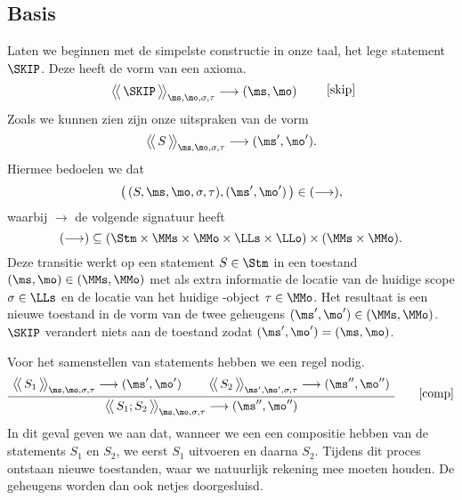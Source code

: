 \subsection{Basis}

Laten we beginnen met de simpelste constructie in onze taal, het lege statement $\SKIP$. Deze heeft de vorm van een axioma.
%
\begin{equation*}
  \AxiomC{$
    \Config{\SKIP}{\ms, \mo, \sigma, \tau}
    \longrightarrow
    (\ms, \mo)
  $}
  {\DisplayProof}
  \tag*{[skip]}
\end{equation*}
%
Zoals we kunnen zien zijn onze uitspraken van de vorm
%
\begin{equation*}
  \Config{S}{\ms,\mo,\sigma,\tau} \longrightarrow (\ms',\mo').
\end{equation*}
%
Hiermee bedoelen we dat
%
\begin{equation*}
  \big(\,(S,\ms,\mo,\sigma,\tau), (\ms',\mo')\,\big) \in (\longrightarrow),
\end{equation*}
%
waarbij $\longrightarrow$ de volgende signatuur heeft 
%
\begin{equation*}
  (\longrightarrow) \subseteq (\Stm \times \MMs \times \MMo \times \LLs \times \LLo) \times (\MMs \times \MMo).
\end{equation*}
%
Deze transitie werkt op een statement $S\in\Stm$ in een toestand $(\ms,\mo)\in(\MMs,\MMo)$ met als extra informatie de locatie van de huidige scope $\sigma\in\LLs$ en de locatie van het huidige \THIS-object $\tau\in\MMo$. Het resultaat is een nieuwe toestand in de vorm van de twee geheugens $(\ms',\mo')\in(\MMs,\MMo)$. $\SKIP$ verandert niets aan de toestand zodat $(\ms',\mo')=(\ms,\mo)$.

Voor het samenstellen van statements hebben we een regel nodig.
%
\begin{gather*}
  \AxiomC{$
    \Config{S_1}{\ms, \mo, \sigma, \tau}
    \longrightarrow
    (\ms', \mo')
  $}
  \AxiomC{$
    \Config{S_2}{\ms', \mo', \sigma, \tau}
    \longrightarrow
    (\ms'', \mo'')
  $}
  \BinaryInfC{$
    \Config{S_1; S_2}{\ms, \mo, \sigma, \tau}
    \longrightarrow
    (\ms'', \mo'')
  $}
  {\DisplayProof}
  \tag*{[comp]}
\end{gather*}
%
In dit geval geven we aan dat, wanneer we een een compositie hebben van de statements $S_1$ en $S_2$, we eerst $S_1$ uitvoeren%
en daarna $S_2$. Tijdens dit proces ontstaan nieuwe toestanden, waar we natuurlijk rekening mee moeten houden. De geheugens worden dan ook netjes doorgesluisd.

